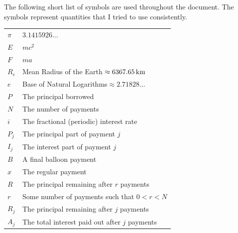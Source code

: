\documentclass[11pt,expanded,copyright]{fsuthesis}
\begin{document}
\begin{listofsymbols}
The following short list of symbols are used throughout the document.
The symbols represent quantities that I tried to use consistently.
\begin{center}
\begin{tabular}{ll}
$\pi$&$3.1415926\ldots$\\
$E$&$mc^2$\\
$F$&$ma$\\
$R_e$&Mean Radius of the Earth${}\approx 6367.65\,\textup{km}$\\
$e$&Base of Natural Logarithms${}\approx 2.71828\ldots$\\
$P$&The principal borrowed\\
$N$&The number of payments\\
$i$&The fractional (periodic) interest rate\\
$P_j$&The principal part of payment $j$\\
$I_j$&The interest part of payment $j$\\
$B$&A final balloon payment\\
$x$&The regular payment\\
$R$&The principal remaining after $r$ payments \\
$r$&Some number of payments such that $0 < r < N$ \\
$R_j$&The principal remaining after $j$ payments \\
$A_j$&The total interest paid out after $j$ payments
\end{tabular}
\end{center}
\end{listofsymbols}


\end{document}
